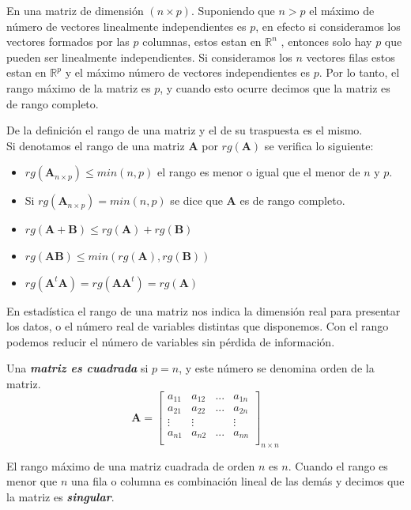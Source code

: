 \documentclass[12pt,letterpaper]{report} %
\begin{document}
En una matriz de dimensión $(n \times p)$. Suponiendo que $n>p$ el máximo de número de vectores linealmente independientes es $p$, en efecto si consideramos los vectores formados por las $p$ columnas, estos estan en $\mathbb{R}^n$ , entonces solo hay $p$ que pueden ser linealmente independientes. Si consideramos los $n$ vectores filas estos estan en $\mathbb{R}^p$ y el máximo número de vectores independientes es $p$. Por lo tanto, el rango máximo de la matriz es $p$, y cuando esto ocurre decimos que la matriz es de rango completo. 

De la definición el rango de una matriz y el de su traspuesta es el mismo.
\\
Si denotamos el rango de una matriz $\mathbf{A}$ por $rg(\mathbf{A})$ se verifica lo siguiente:
\begin{itemize}
\item $rg(\mathbf{A}_{n\times p})\le min(n,p)$ el rango es menor o igual que el menor de $n$ y $p$.
\item Si $rg(\mathbf{A}_{n\times p})=min(n,p)$ se dice que $\mathbf{A}$ es de rango completo. 
\item $rg(\mathbf{A}+\mathbf{B}) \le rg(\mathbf{A}) + rg(\mathbf{B})$
\item $rg(\mathbf{AB}) \le min(rg(\mathbf{A}),rg(\mathbf{B}))$
\item $rg(\mathbf{A}^t\mathbf{A})=rg(\mathbf{A}\mathbf{A}^t)=rg(\mathbf{A})$
\end{itemize}

En estadística el rango de una matriz nos indica la dimensión real para presentar los datos, o  el número real de variables distintas que disponemos. Con el rango podemos reducir el número de variables sin pérdida de información.

Una \textit{\textbf{matriz es cuadrada}} si $p=n$, y este número se denomina orden de la matriz.
$$
\mathbf{A}=
\begin{bmatrix}
a_{11} & a_{12} & ... & a_{1n} \\
a_{21} & a_{22} & ... & a_{2n} \\
\vdots & \vdots &     & \vdots \\
a_{n1} & a_{n2} & ... & a_{nn} \\
\end{bmatrix}_{n\times n}
$$

El rango máximo de una matriz cuadrada de orden $n$ es $n$. Cuando el rango es menor que $n$ una fila o columna es combinación lineal de las demás y decimos que la matriz es \textit{\textbf{singular}}.
\end{document}
